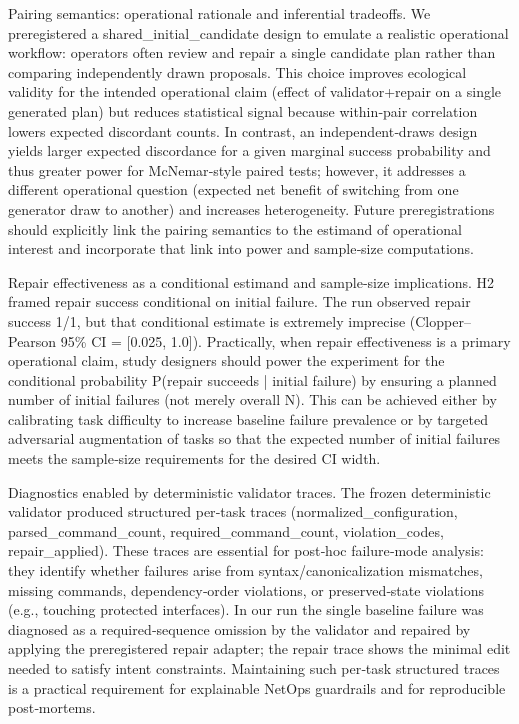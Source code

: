 \documentclass[conference]{IEEEtran}
\begin{document}
Pairing semantics: operational rationale and inferential tradeoffs. We preregistered a shared\_initial\_candidate design to emulate a realistic operational workflow: operators often review and repair a single candidate plan rather than comparing independently drawn proposals. This choice improves ecological validity for the intended operational claim (effect of validator+repair on a single generated plan) but reduces statistical signal because within‑pair correlation lowers expected discordant counts. In contrast, an independent‑draws design yields larger expected discordance for a given marginal success probability and thus greater power for McNemar‑style paired tests; however, it addresses a different operational question (expected net benefit of switching from one generator draw to another) and increases heterogeneity. Future preregistrations should explicitly link the pairing semantics to the estimand of operational interest and incorporate that link into power and sample‑size computations.

Repair effectiveness as a conditional estimand and sample‑size implications. H2 framed repair success conditional on initial failure. The run observed repair success 1/1, but that conditional estimate is extremely imprecise (Clopper--Pearson 95\% CI = [0.025, 1.0]). Practically, when repair effectiveness is a primary operational claim, study designers should power the experiment for the conditional probability P(repair succeeds | initial failure) by ensuring a planned number of initial failures (not merely overall N). This can be achieved either by calibrating task difficulty to increase baseline failure prevalence or by targeted adversarial augmentation of tasks so that the expected number of initial failures meets the sample‑size requirements for the desired CI width.

Diagnostics enabled by deterministic validator traces. The frozen deterministic validator produced structured per‑task traces (normalized\_configuration, parsed\_command\_count, required\_command\_count, violation\_codes, repair\_applied). These traces are essential for post‑hoc failure‑mode analysis: they identify whether failures arise from syntax/canonicalization mismatches, missing commands, dependency‑order violations, or preserved‑state violations (e.g., touching protected interfaces). In our run the single baseline failure was diagnosed as a required‑sequence omission by the validator and repaired by applying the preregistered repair adapter; the repair trace shows the minimal edit needed to satisfy intent constraints. Maintaining such per‑task structured traces is a practical requirement for explainable NetOps guardrails and for reproducible post‑mortems.
\end{document}
